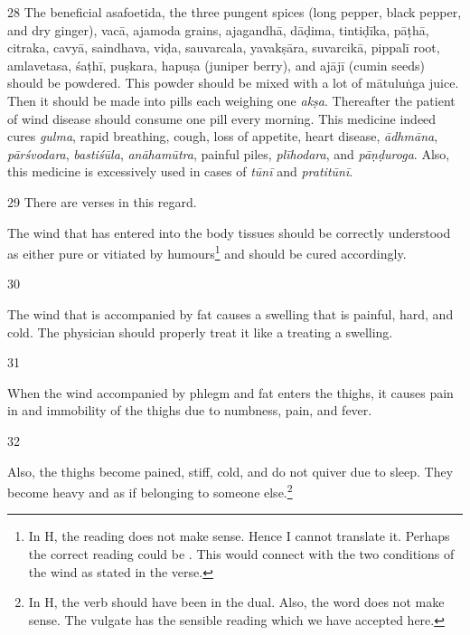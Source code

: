 \begin{translation}
    \item[28]
    The beneficial asafoetida, the three pungent spices (long pepper, black pepper, and dry ginger), \gls{vacā}, \gls{ajamoda} grains, \gls{ajagandhā}, \gls{dāḍima}, \gls{tintiḍīka}, \gls{pāṭhā}, \gls{citraka}, \gls{cavyā}, \gls{saindhava}, \gls{viḍa}, \gls{sauvarcala}, \gls{yavakṣāra}, \gls{suvarcikā}, \gls{pippalī} root, \gls{amlavetasa}, \gls{śaṭhī}, \gls{puṣkara}, \gls{hapuṣa} (juniper berry), and \gls{ajājī} (cumin seeds) should be powdered. This powder should be mixed with a lot of \gls{mātuluṅga} juice. Then it should be made into pills each weighing one \textit{akṣa}. Thereafter the patient of wind disease should consume one pill every morning. This medicine indeed cures \textit{gulma}, rapid breathing, cough, loss of appetite, heart disease, \textit{ādhmāna}, \textit{pārśvodara}, \textit{bastiśūla}, \textit{anāhamūtra}, painful piles, \textit{plīhodara}, and \textit{pāṇḍuroga}. Also, this medicine is excessively used in cases of \textit{tūnī} and \textit{pratitūnī}.
 
    \item[29]
    There are verses in this regard. 
    \begin{sloka}
    The wind that has entered into the body tissues should be correctly understood as either pure or vitiated by humours\footnote{In H, the reading  does not make sense. Hence I cannot translate it. Perhaps the correct reading could be . This would connect with the two conditions of the wind as stated in the verse.} and should be cured accordingly. 
    \end{sloka}

    \item[30]
    \begin{sloka}
    The wind that is accompanied by fat causes a swelling that is painful, hard, and cold. The physician should properly treat it like a treating a swelling.
    \end{sloka}

    \item[31]
    \begin{sloka}
    When the wind accompanied by phlegm and fat enters the thighs, it causes pain in and immobility of the thighs due to numbness, pain, and fever. 
    \end{sloka}

    \item[32] 
    \begin{sloka}
    Also, the thighs become pained, stiff, cold, and do not quiver due to sleep. They become heavy and as if belonging to someone else.\footnote{In H, the verb  should have been in the dual. Also, the word  does not make sense. The vulgate has the sensible reading  which we have accepted here.}
    \end{sloka}


\end{translation}
